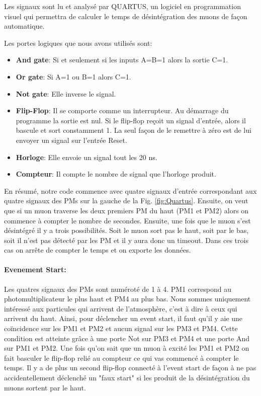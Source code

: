 \documentclass[12pt]{article}
\begin{document}
Les signaux sont lu et analysé par QUARTUS, un logiciel en programmation visuel qui permettra de calculer le temps de désintégration des muons de façon automatique.

Les portes logiques que nous avons utilisés sont:
\begin{itemize}
    \item \textbf{And gate}: Si et seulement si les inputs A=B=1 alors la sortie C=1.
    \item \textbf{Or gate}: Si A=1 ou B=1 alors C=1.
    \item \textbf{Not gate}: Elle inverse le signal.
    \item \textbf{Flip-Flop}: Il se comporte comme un interrupteur. Au démarrage du programme la sortie est nul. Si le flip-flop reçoit un signal d'entrée, alors il bascule et sort constamment 1. La seul façon de le remettre à zéro est de lui envoyer un signal sur l'entrée Reset.
    \item \textbf{Horloge}: Elle envoie un signal tout les 20 ns.
    \item \textbf{Compteur}: Il compte le nombre de signal que l'horloge produit.
\end{itemize}

En résumé, notre code commence avec quatre signaux d'entrée correspondant aux quatre signaux des PMs sur la gauche de la Fig. \ref{fig:Quartus}. Ensuite, on veut que si un muon traverse les deux premiers PM du haut (PM1 et PM2) alors on commence à compter le nombre de secondes. Ensuite, une fois que le muon s'est désintégré il y a trois possibilités. Soit le muon sort pas le haut, soit par le bas, soit il n'est pas détecté par les PM et il y aura donc un timeout. Dans ces trois cas on arrête de compter le temps et on exporte les données.
\paragraph{Evenement Start:}
Les quatres signaux des PMs sont numéroté de 1 à 4. PM1 correspond au photomultiplicateur le plus haut et PM4 au plus bas. Nous sommes uniquement intéressé aux particules qui arrivent de l'atmosphère, c'est à dire à ceux qui arrivent du haut. Ainsi, pour déclencher un event start, il faut qu'il y aie une coïncidence sur les PM1 et PM2 et aucun signal sur les PM3 et PM4. Cette condition est atteinte grâce à une porte Not sur PM3 et PM4 et une porte And sur PM1 et PM2. Une fois qu'on sait que un muon à excité les PM1 et PM2 on fait basculer le flip-flop relié au compteur ce qui vas commencé à compter le temps. Il y a de plus un second flip-flop connecté à l'event start de façon à ne pas accidentellement déclenché un "faux start" si les produit de la désintégration du muons sortent par le haut.
\end{document}
